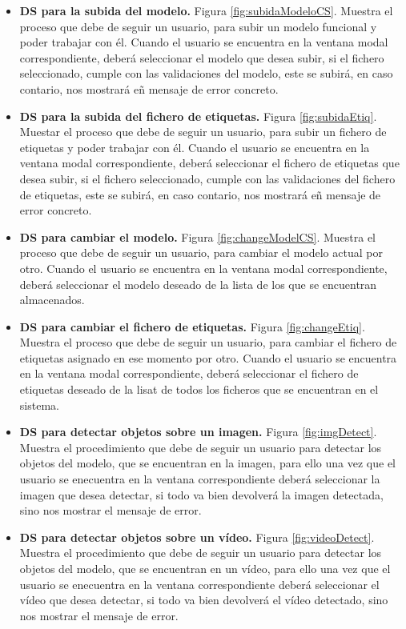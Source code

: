 \begin{itemize}
    \item \textbf{DS para la subida del modelo.} Figura \ref{fig:subidaModeloCS}. Muestra el proceso que debe de seguir un usuario, para subir un modelo funcional y poder trabajar con él. Cuando el usuario se encuentra en la ventana modal correspondiente, deberá seleccionar el modelo que desea
    subir, si el fichero seleccionado, cumple con las validaciones del modelo, este se subirá, en caso contario, nos mostrará eñ mensaje de error concreto.
    \item \textbf{DS para la subida del fichero de etiquetas.} Figura \ref{fig:subidaEtiq}. Muestar el proceso que debe de seguir un usuario, para subir un fichero de etiquetas y poder trabajar con él. Cuando el usuario se encuentra en la ventana modal correspondiente, deberá seleccionar el fichero de etiquetas que desea
    subir, si el fichero seleccionado, cumple con las validaciones del fichero de etiquetas, este se subirá, en caso contario, nos mostrará eñ mensaje de error concreto.
    \item \textbf{DS para cambiar el modelo.} Figura \ref{fig:changeModelCS}. Muestra el proceso que debe de seguir un usuario, para cambiar el modelo actual por otro. Cuando el usuario se encuentra en la ventana modal correspondiente, deberá seleccionar el modelo deseado de la lista de los que se encuentran almacenados.
    \item \textbf{DS para cambiar el fichero de etiquetas.} Figura \ref{fig:changeEtiq}. Muestra el proceso que debe de seguir un usuario, para cambiar el fichero de etiquetas asignado en ese momento por otro. Cuando el usuario se encuentra en la ventana modal correspondiente, deberá seleccionar el fichero de etiquetas deseado de la lisat de todos los ficheros que se encuentran en el sistema.
    \item \textbf{DS para detectar objetos sobre un imagen.} Figura \ref{fig:imgDetect}. Muestra el procedimiento que debe de seguir un usuario para detectar los objetos del modelo, que se encuentran en la imagen, para ello una vez que el usuario se enecuentra en la ventana correspondiente deberá seleccionar la imagen que desea detectar, si todo va bien devolverá la imagen detectada, sino nos mostrar el mensaje de error.
    \item \textbf{DS para detectar objetos sobre un vídeo.} Figura \ref{fig:videoDetect}. Muestra el procedimiento que debe de seguir un usuario para detectar los objetos del modelo, que se encuentran en un vídeo, para ello una vez que el usuario se enecuentra en la ventana correspondiente deberá seleccionar el vídeo que desea detectar, si todo va bien devolverá el vídeo detectado, sino nos mostrar el mensaje de error. 

\end{itemize}
